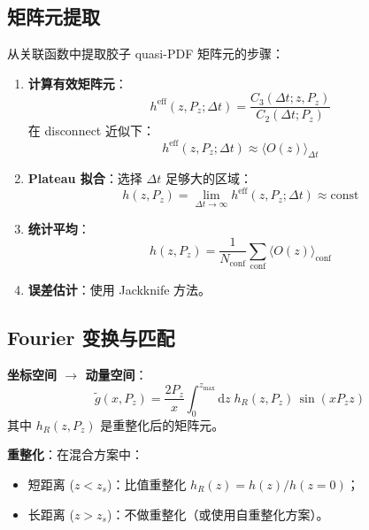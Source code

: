 \documentclass[11pt,a4paper]{ctexart}
\newcommand{\vev}[1]{\langle #1 \rangle}
\begin{document}
\subsection{矩阵元提取}

从关联函数中提取胶子 quasi-PDF 矩阵元的步骤：

\begin{enumerate}
  \item \textbf{计算有效矩阵元}：
  \begin{equation}
  h^{\text{eff}}(z, P_z; \Delta t) = \frac{C_3(\Delta t; z, P_z)}{C_2(\Delta t; P_z)}
  \end{equation}
  在 disconnect 近似下：
  \begin{equation}
  h^{\text{eff}}(z, P_z; \Delta t) \approx \vev{O(z)}_{\Delta t}
  \end{equation}

  \item \textbf{Plateau 拟合}：选择 $\Delta t$ 足够大的区域：
  \begin{equation}
  h(z, P_z) = \lim_{\Delta t \to \infty} h^{\text{eff}}(z, P_z; \Delta t)
  \approx \text{const}
  \end{equation}

  \item \textbf{统计平均}：
  \begin{equation}
  h(z, P_z) = \frac{1}{N_{\text{conf}}} \sum_{\text{conf}} \vev{O(z)}_{\text{conf}}
  \end{equation}

  \item \textbf{误差估计}：使用 Jackknife 方法。
\end{enumerate}

\subsection{Fourier 变换与匹配}

\textbf{坐标空间 $\to$ 动量空间}：
\begin{equation}\label{eq:fourier}
\boxed{\tilde{g}(x, P_z) = \frac{2P_z}{x}
\int_{0}^{z_{\text{max}}} \mathrm{d}z \;
h_R(z, P_z) \, \sin(x P_z z)}
\end{equation}
其中 $h_R(z, P_z)$ 是重整化后的矩阵元。

\textbf{重整化}：在混合方案中：
\begin{itemize}
  \item 短距离 ($z < z_s$)：比值重整化 $h_R(z) = h(z) / h(z=0)$；
  \item 长距离 ($z > z_s$)：不做重整化（或使用自重整化方案）。
\end{itemize}
\end{document}
